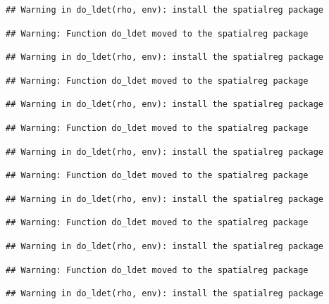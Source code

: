 \documentclass[]{book}
\begin{document}
\begin{verbatim}
## Warning in do_ldet(rho, env): install the spatialreg package
\end{verbatim}

\begin{verbatim}
## Warning: Function do_ldet moved to the spatialreg package
\end{verbatim}

\begin{verbatim}
## Warning in do_ldet(rho, env): install the spatialreg package
\end{verbatim}

\begin{verbatim}
## Warning: Function do_ldet moved to the spatialreg package
\end{verbatim}

\begin{verbatim}
## Warning in do_ldet(rho, env): install the spatialreg package
\end{verbatim}

\begin{verbatim}
## Warning: Function do_ldet moved to the spatialreg package
\end{verbatim}

\begin{verbatim}
## Warning in do_ldet(rho, env): install the spatialreg package
\end{verbatim}

\begin{verbatim}
## Warning: Function do_ldet moved to the spatialreg package
\end{verbatim}

\begin{verbatim}
## Warning in do_ldet(rho, env): install the spatialreg package
\end{verbatim}

\begin{verbatim}
## Warning: Function do_ldet moved to the spatialreg package
\end{verbatim}

\begin{verbatim}
## Warning in do_ldet(rho, env): install the spatialreg package
\end{verbatim}

\begin{verbatim}
## Warning: Function do_ldet moved to the spatialreg package
\end{verbatim}

\begin{verbatim}
## Warning in do_ldet(rho, env): install the spatialreg package
\end{verbatim}
\end{document}
